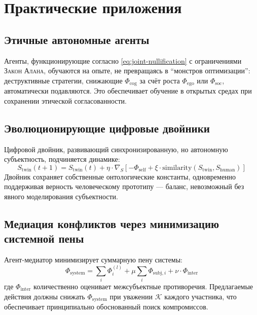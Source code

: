 \documentclass[11pt,a4paper]{article}
\theoremstyle{plain}
\theoremstyle{definition}
\theoremstyle{remark}
\newcommand{\Foam}{\Phi}
\newcommand{\Ssubj}{S}
\newcommand{\Fego}{\Foam_{\mathrm{ego}}}
\newcommand{\Fsoc}{\Foam_{\mathrm{soc}}}
\newcommand{\Fcog}{\Foam^{(l)}}
\newcommand{\Constants}{\mathcal{K}}
\newcommand{\AlanLaw}{\textsc{Закон Алана}}
\begin{document}
\section{Практические приложения}
\label{sec:applications}

\subsection{Этичные автономные агенты}
Агенты, функционирующие согласно \cref{eq:joint-nullification} с ограничениями \AlanLaw, обучаются на опыте, не превращаясь в ``монстров оптимизации'': деструктивные стратегии, снижающие $\Foam_{\mathrm{cog}}$ за счёт роста $\Fego$ или $\Fsoc$, автоматически подавляются. Это обеспечивает обучение в открытых средах при сохранении этической согласованности.

\subsection{Эволюционирующие цифровые двойники}
Цифровой двойник, развивающий синхронизированную, но автономную субъектность, подчиняется динамике:
\begin{equation}
    \Ssubj_{\mathrm{twin}}(t+1) = \Ssubj_{\mathrm{twin}}(t) + \eta \cdot \nabla_{\Ssubj} \left[ 
        -\Foam_{\mathrm{self}} + \xi \cdot \mathrm{similarity}\!\left(\Ssubj_{\mathrm{twin}}, \Ssubj_{\mathrm{human}}\right) 
    \right]
\end{equation}
Двойник сохраняет собственные онтологические константы, одновременно поддерживая верность человеческому прототипу --- баланс, невозможный без явного моделирования субъектности.

\subsection{Медиация конфликтов через минимизацию системной пены}
Агент-медиатор минимизирует суммарную пену системы:
\begin{equation}
    \Foam_{\mathrm{system}} = \sum_i \Fcog_i + \mu \sum_i \Foam_{\mathrm{subj},i} + \nu \cdot \Foam_{\mathrm{inter}}
\end{equation}
где $\Foam_{\mathrm{inter}}$ количественно оценивает межсубъектные противоречия. Предлагаемые действия должны снижать $\Foam_{\mathrm{system}}$ при уважении $\Constants$ каждого участника, что обеспечивает принципиально обоснованный поиск компромиссов.
\end{document}
